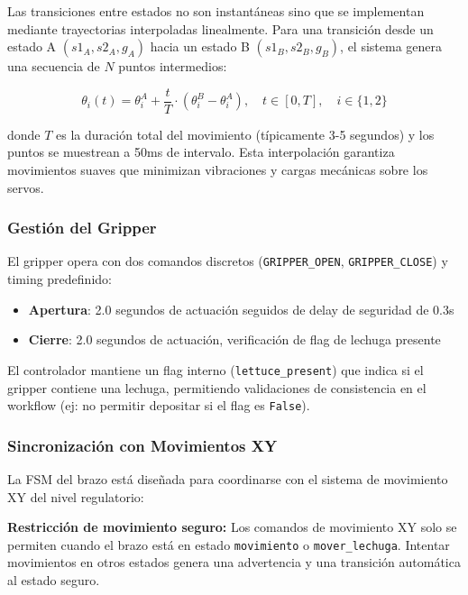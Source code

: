 Las transiciones entre estados no son instantáneas sino que se implementan mediante trayectorias interpoladas linealmente. Para una transición desde un estado A $(s1_A, s2_A, g_A)$ hacia un estado B $(s1_B, s2_B, g_B)$, el sistema genera una secuencia de $N$ puntos intermedios:

\begin{equation}
\theta_i(t) = \theta_i^A + \frac{t}{T} \cdot (\theta_i^B - \theta_i^A), \quad t \in [0, T], \quad i \in \{1, 2\}
\end{equation}

donde $T$ es la duración total del movimiento (típicamente 3-5 segundos) y los puntos se muestrean a 50ms de intervalo. Esta interpolación garantiza movimientos suaves que minimizan vibraciones y cargas mecánicas sobre los servos.

\subsubsection{Gestión del Gripper}

El gripper opera con dos comandos discretos (\texttt{GRIPPER\_OPEN}, \texttt{GRIPPER\_CLOSE}) y timing predefinido:

\begin{itemize}
    \item \textbf{Apertura}: 2.0 segundos de actuación seguidos de delay de seguridad de 0.3s
    \item \textbf{Cierre}: 2.0 segundos de actuación, verificación de flag de lechuga presente
\end{itemize}

El controlador mantiene un flag interno (\texttt{lettuce\_present}) que indica si el gripper contiene una lechuga, permitiendo validaciones de consistencia en el workflow (ej: no permitir depositar si el flag es \texttt{False}).

\subsubsection{Sincronización con Movimientos XY}

La FSM del brazo está diseñada para coordinarse con el sistema de movimiento XY del nivel regulatorio:

\textbf{Restricción de movimiento seguro:} Los comandos de movimiento XY solo se permiten cuando el brazo está en estado \texttt{movimiento} o \texttt{mover\_lechuga}. Intentar movimientos en otros estados genera una advertencia y una transición automática al estado seguro.

